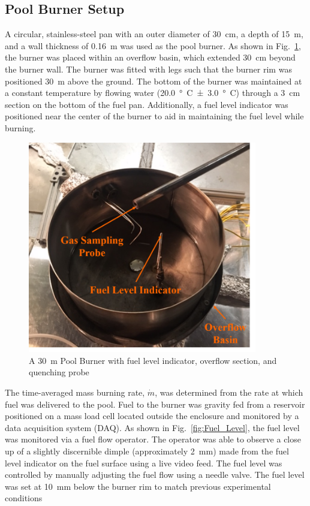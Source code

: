 \documentclass[12pt]{article}
\begin{document}
\subsection{Pool Burner Setup}
\label{ssec:Pool_Burner_Setup}
A circular, stainless-steel pan with an outer diameter of \SI{30}{cm}, a depth of \SI{15}{m}, and a wall thickness of \SI{0.16}{m} was used as the pool burner. As shown in Fig.~\ref{fig:Pool Burner}, the burner was placed within an overflow basin, which extended \SI{30}{cm} beyond the burner wall. The burner was fitted with legs such that the burner rim was positioned \SI{30}{m} above the ground. The bottom of the burner was maintained at a constant temperature by flowing water (\SI{20.0}{\degree C}~±~\SI{3.0}{\degree C}) through a \SI{3}{cm} section on the bottom of the fuel pan. Additionally, a fuel level indicator was positioned near the center of the burner to aid in maintaining the fuel level while burning.

\begin{figure}[h!]
	\centering
\includegraphics[width=10.0cm,keepaspectratio]{Pool_Burner.png}
	\caption[A \SI{30}{m} Pool Burner with fuel level indicator, overflow section, and quenching probe]{A \SI{30}{m} Pool Burner with fuel level indicator, overflow section, and quenching probe}
	\label{fig:Pool Burner}
\end{figure}

The time-averaged mass burning rate, $\dot{m}$, was determined from the rate at which fuel was delivered to the pool. Fuel to the burner was gravity fed from a reservoir positioned on a mass load cell located outside the enclosure and monitored by a data acquisition system (DAQ). As shown in Fig.~\ref{fig:Fuel_Level}, the fuel level was monitored via a fuel flow operator. The operator was able to observe a close up of a slightly discernible dimple (approximately \SI{2}{mm}) made from the fuel level indicator on the fuel surface using a live video feed. The fuel level was controlled by manually adjusting the fuel flow using a needle valve. The fuel level was set at \SI{10}{mm} below the burner rim to match previous experimental conditions \cite{Fisher1987,Hamins2016,Kim2019,Weckman1996}
\end{document}
